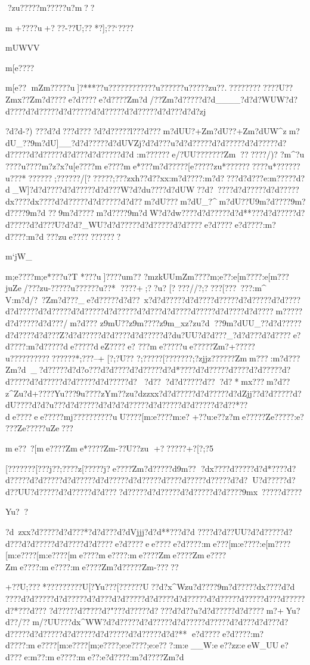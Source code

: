 ?zu?????{m?????u?m??}{m
+????u +???-??U;??*?];??`????{mUWVV{m[e????{m[e??
{mZm?????u]?***??u??????}??????u??????u?????zu??. ????????????U??Zmx??Zm?d????e?d????e?d????Zm?d/??Zm?d?????d?d____?d?d?WUW?d?d ????d?d?????d?d?????d?d?????d?d?????d?d???d?d?zj{?d?d-?)%
???d?d ???d?\????d?d?????l?\???d?\??? m?dUU?+Zm?dU??+Zm?dUW^zm?dU_??9m?dU]__?d?d?????d?dUVZj?d?d???u?d?d?????d?d?????d?d?????d?d?????d?d?????d?d???d?d?????d?d    :m?\*?????e/?UU??\??????Zm??????/)??{m^\Xp{m[e
???u{m?)=?}?u????}?u 
????u????}{m?z?x?u[e????{me????{me*???{m?d?????}[e?????zu*?????}?????u*??????u???*??????;??????/[??????;???zxh?}?d??xx:m?d????:m?d????d?d???e:m?\?????d?d_W]?d?d ????d?d?????d?d???W?d?du????d?dUW??d?\
????d?d?????d?d?????dx\*????dx\ ????d?d?????d?d?????d?d??m?dU???m?dU_?^m?dU??U9m?d????9m?d????9m?d
??9m?d????m?d????9m?d^^^W?d?dw????d?d?????d?d**???d?d?????d?d?????d?d???U?d?d?_WU?d?d?????d?d?????d?d????e?d????e?d????:m?d????:m?d
???zue??????}?????{m`jW_{m;e????{m;e*???u?T
*???u] ????u{m ??
?}{mzkUU{mZm????{m;e??:e[m????:e[m???j{uZe/???}zu-?????u??????u??*
????+;??u?
[????//{?;????[???~???:m^\\V:m?d/?~?Zm?d???_e?d?????d?d??~x?d?d?????d?d????d?\ ????d?d?????d?d????d?d?????d?d?????d?d?????d?d?????d?d???d?d????d?\?????d?d????d?d????m?\?????d?d?????d?d???/m?d???
z}9mU}??z}9m????z}9m_xz?zu?d??9m?dUU_??d?d?????d?d????d?d???Z?d?d?????d?d??{??d?d?????d?du?UU?d?d???_?d?d???d?d????e?d????:m?d?????de?????deZ????e?%
???{me?????ue?????}Zm?+?????u???????}??? ??????*;???--+
[?;?U??
{?;?????[?{?????{?;?zjjz???\????Zmm???:m?d???Zm?d_?d?\ ????d?d?o???d?d????d?d?????d?d*????d?d?????d?\????d?d?????d?d?????d?d?????d?d?????d?d?????d?\ ?d?\*??d?d?????d?\ ??d?\  *mx\????m?d??z^Zu?d+????}Yu???}9u????z}Ym??zu?dzzxx?d?d?????d?d?????d?dZjj??d?d?????d?dU????d?d?u???d?d?????d?d    ?d?d?????d?d?????d?d?????d?d??*??de????ee?????\:mj??????\ ????uU????[m:e????{m:e?
+??u:e??z?{me?????}Ze?????}:e?
???}Ze?????uZe???{me??~?[me????Zme*????Zm-??U??zu
+??????+?[?;?5
	
[?{?????{?[???j?{?;????z[??}???j?}e????Zm?d?????d9m??
?dx\ ????d?\?????d?d*????d?d?????d?d?????d?d?????d?d?????d?d?????d?\????d?\?????d?\?????d?d?U?d?\?????d?d??UU?d?\?????d?d?????d?d????d?\?????d?d?????d?d?????d?d????9mx???}?d????}Yu??}?d~zxx?d?\?????d?d???*?d?d???d?dVjjj?d?d**???d?d
????d?d??UU?d?d?????d?d???d?d?????d?d????d?d????e?d????ee????e?d????:me???[m:e????:e[m????[m:e????[m:e????[me????{me????:me????Zme????Zme????Zme????:me????:me????Zm?d?????}Zm-?????}+??U;???*?????????U[?Yu ???[??????U??d?x^Wzu?d????9m?d?????dx\?????d?d
????d?d?????d?d?????d?d???d?d?????d?d????d?d?????d?d?????d?\?????d?\???d?\?????d?\?*???d?\*??
?d?\????d?\"????d?\?"???d?\*????d?\????d?d??u?d?d?????d?d????m?\?+ Yu?d??/??m/?UU???dx^WW?d?d?????d?d?????d?d?????d?\?????d?d???d?d???d?d?????d?d?????d?d?????d?d?????d?d?????d?d?**
e?d????e?d????:m?d????:me????[m:e????[m;e????;e:e????;e:e???:m:e__W:ee??zz:eeW_UUe?d ???e:m??  :me????:me??:e?d????:m?d????Zm?d

}}}}}

